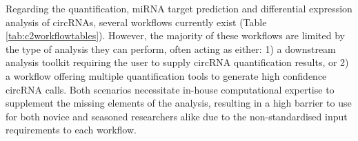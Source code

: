 Regarding the quantification, miRNA target prediction and differential expression analysis of circRNAs, several workflows currently exist (Table \ref{tab:c2workflowtables}). However, the majority of these workflows are limited by the type of analysis they can perform, often acting as either: 1) a downstream analysis toolkit requiring the user to supply circRNA quantification results, or 2) a workflow offering multiple quantification tools to generate high confidence circRNA calls. Both scenarios necessitate in-house computational expertise to supplement the missing elements of the analysis, resulting in a high barrier to use for both novice and seasoned researchers alike due to the non-standardised input requirements to each workflow.\par


\begin{centering}
\begin{table}[h!]
    \caption[List of current circRNA analysis workflows]{\textbf{List of current circRNA analysis workflows}.}
\end{table}
\end{centering}
